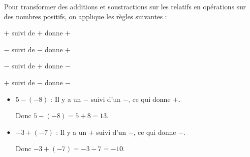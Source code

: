 \documentclass[../€Cours-complet/Cours-complet]{subfiles}
\begin{document}
\begin{methode}
	Pour transformer des additions et soustractions sur les relatifs en opérations sur des nombres positifs, on applique les règles suivantes :

	\begin{center}
		$+$ suivi de $+$ donne $+$

		$-$ suivi de $-$ donne $+$

		$-$ suivi de $+$ donne $-$

		$+$ suivi de $-$ donne $-$
	\end{center}
\end{methode}

\begin{exemple}
	\begin{itemize}
		\item $5 - (-8)$ : Il y a un $-$ suivi d'un $-$, ce qui donne $+$.

		      Donc $5 - (-8) = 5 + 8 = 13$.
		\item $-3 + (-7)$ : Il y a un $+$ suivi d'un $-$, ce qui donne $-$.

		      Donc $-3 + (-7) = -3 - 7 = -10$.
	\end{itemize}
\end{exemple}
\end{document}

